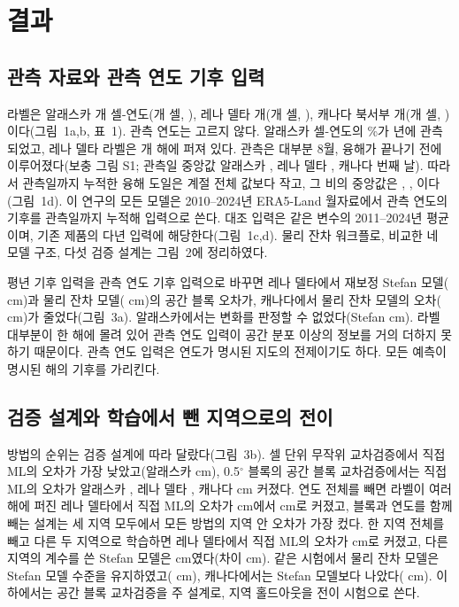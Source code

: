 \section{결과}\label{sec:results}

\subsection{관측 자료와 관측 연도 기후 입력}
라벨은 알래스카 \nncyAk{}개 셀-연도(\nncellAk{}개 셀, \nyrsAkko), 레나 델타 \nncyLe{}개(\nncellLe{}개 셀, \nyrsLeko), 캐나다 북서부 \nncyCa{}개(\nncellCa{}개 셀, \nyrsCako)이다(그림~1a,b, 표~1). 관측 연도는 고르지 않다. 알래스카 셀-연도의 \ntopyrshareAk\%가 \ntopyrAk{}년에 관측되었고, 레나 델타 라벨은 \nnyrLe{}개 해에 퍼져 있다. 관측은 대부분 8월, 융해가 끝나기 전에 이루어졌다(보충 그림 S1; 관측일 중앙값 알래스카 \ndoymedAk, 레나 델타 \ndoymedLe, 캐나다 \ndoymedCa{}번째 날). 따라서 관측일까지 누적한 융해 도일은 계절 전체 값보다 작고, 그 비의 중앙값은 \ntddfracAk, \ntddfracLe, \ntddfracCa{}이다(그림~1d). 이 연구의 모든 모델은 2010--2024년 ERA5-Land 월자료에서 관측 연도의 기후를 관측일까지 누적해 입력으로 쓴다. 대조 입력은 같은 변수의 2011--2024년 평균이며, 기존 제품의 다년 입력에 해당한다(그림~1c,d). 물리 잔차 워크플로, 비교한 네 모델 구조, 다섯 검증 설계는 그림~2에 정리하였다.

평년 기후 입력을 관측 연도 기후 입력으로 바꾸면 레나 델타에서 재보정 Stefan 모델(\ndforcLePo{} cm)과 물리 잔차 모델(\ndforcLeRo{} cm)의 공간 블록 오차가, 캐나다에서 물리 잔차 모델의 오차(\ndforcCaRo{} cm)가 줄었다(그림~3a). 알래스카에서는 변화를 판정할 수 없었다(Stefan \ndforcAkPo{} cm). 라벨 대부분이 한 해에 몰려 있어 관측 연도 입력이 공간 분포 이상의 정보를 거의 더하지 못하기 때문이다. 관측 연도 입력은 연도가 명시된 지도의 전제이기도 하다. 모든 예측이 명시된 해의 기후를 가리킨다.

\subsection{검증 설계와 학습에서 뺀 지역으로의 전이}
방법의 순위는 검증 설계에 따라 달랐다(그림~3b). 셀 단위 무작위 교차검증에서 직접 ML의 오차가 가장 낮았고(알래스카 \nrmseAkrandDz{} cm), 0.5$^\circ$ 블록의 공간 블록 교차검증에서는 직접 ML의 오차가 알래스카 \noptimAkDz, 레나 델타 \noptimLeDz, 캐나다 \noptimCaDz{} cm 커졌다. 연도 전체를 빼면 라벨이 여러 해에 퍼진 레나 델타에서 직접 ML의 오차가 \nrmseLeblkDz{} cm에서 \nrmseLeyrDz{} cm로 커졌고, 블록과 연도를 함께 빼는 설계는 세 지역 모두에서 모든 방법의 지역 안 오차가 가장 컸다. 한 지역 전체를 빼고 다른 두 지역으로 학습하면 레나 델타에서 직접 ML의 오차가 \nrmseLeregDz{} cm로 커졌고, 다른 지역의 계수를 쓴 Stefan 모델은 \nrmseLeregPz{} cm였다(차이 \ndrefLeregDz{} cm). 같은 시험에서 물리 잔차 모델은 Stefan 모델 수준을 유지하였고(\ndrefLeregRo{} cm), 캐나다에서는 Stefan 모델보다 나았다(\ndrefCaregRo{} cm). 이하에서는 공간 블록 교차검증을 주 설계로, 지역 홀드아웃을 전이 시험으로 쓴다.

